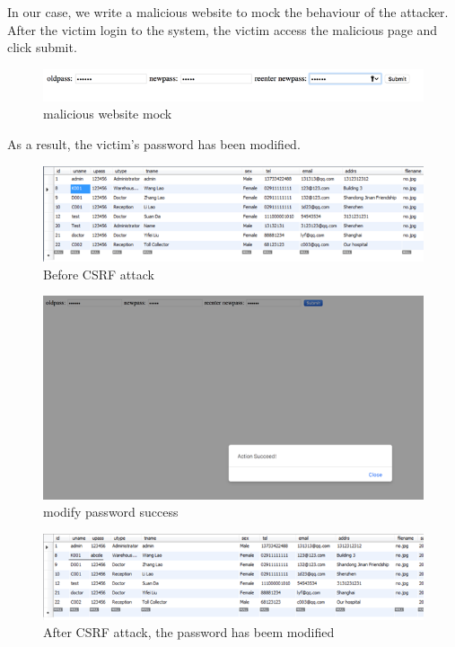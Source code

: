 In our case, we write a malicious website to mock the behaviour of the attacker. After the victim login to the system, the victim access the malicious page and click submit. 
\begin{figure}[H]
    \centering
    \includegraphics[width=\textwidth]{sp/sp5.png}
    \caption{malicious website mock}
    \label{fig:s5}
\end{figure}
As a result, the victim’s password has been modified.
\begin{figure}[H]
    \centering
    \includegraphics[width=\textwidth]{sp/sp6.png}
    \caption{Before CSRF attack}
    \label{fig:s6}
\end{figure}
\begin{figure}[H]
    \centering
    \includegraphics[width=\textwidth]{sp/sp7.png}
    \caption{modify password success}
    \label{fig:s7}
\end{figure}
\begin{figure}[H]
    \centering
    \includegraphics[width=\textwidth]{sp/sp8.png}
    \caption{After CSRF attack, the password has beem modified}
    \label{fig:s8}
\end{figure}
